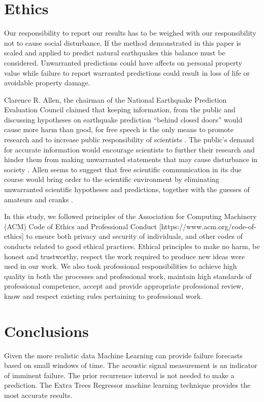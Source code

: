\documentclass[]{llncs} %
\begin{document}
\section{Ethics}

Our responsibility to report our results has to be weighed with our responsibility not to cause social disturbance. If the method demonstrated in this paper is scaled and applied to predict natural earthquakes this balance must be considered. Unwarranted predictions could have affects on personal property value while failure to report warranted predictions could result in loss of life or avoidable property damage. \par

Clarence R. Allen, the chairman of the National Earthquake Prediction Evaluation Council claimed that keeping information, from the public and discussing hypotheses on earthquake prediction “behind closed doors” would cause more harm than good, for free speech is the only means to promote research and to increase public responsibility of scientists \cite{Ayhan}. The public’s demand for accurate information would encourage scientists to further their research and hinder them from making unwarranted statements that may cause disturbance in society \cite{Ayhan}. Allen seems to suggest that free scientific communication in its due course would bring order to the scientific environment by eliminating unwarranted scientific hypotheses and predictions, together with the guesses of amateurs and cranks \cite{Ayhan}.

In this study, we followed principles of the Association for Computing Machinery (ACM) Code of Ethics and Professional Conduct [https://www.acm.org/code-of-ethics] to ensure both privacy and security of individuals, and other codes of conducts related to good ethical practices. Ethical principles to make no harm, be honest and trustworthy, respect the work required to produce new ideas were used in our work. We also took professional responsibilities to achieve high quality in both the processes and professional work, maintain high standards of professional competence, accept and provide appropriate professional review, know and respect existing rules pertaining to professional work.

\section{Conclusions}

Given the more realistic data Machine Learning can provide failure forecasts based on small windows of time. The acoustic signal measurement is an indicator of imminent failure. The prior recurrence interval is not needed to make a prediction. The Extra Trees Regressor machine learning technique provides the most accurate results.
\end{document}
